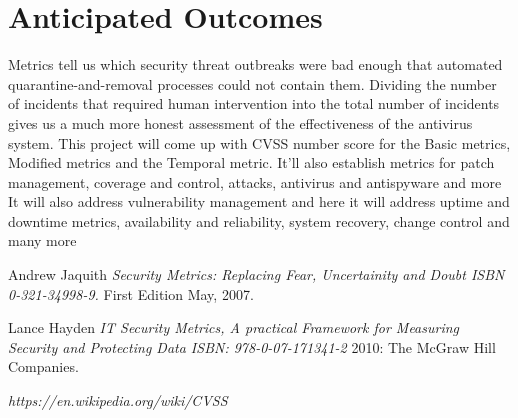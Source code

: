 \documentclass{article}
\begin{document}
\section{Anticipated Outcomes} Metrics tell us
which security threat outbreaks were bad enough that automated quarantine-and-removal
processes could not contain them. Dividing the number of incidents that required
human intervention into the total number of incidents gives us a much more honest
assessment of the effectiveness of the antivirus system. \linebreak
This project will come up with CVSS number score for the Basic metrics, Modified metrics and the Temporal metric. It’ll also establish metrics for patch management, coverage and control, attacks, antivirus and antispyware and more
It will also address vulnerability management and here it will address uptime and downtime metrics, availability and reliability, system recovery, change control and many more

 \begin{thebibliography}{1}

   Andrew Jaquith {\em Security Metrics: Replacing Fear, Uncertainity and Doubt
 ISBN 0-321-34998-9.} First Edition May, 2007.

    Lance Hayden {\em IT Security Metrics, A practical Framework for Measuring Security and Protecting Data ISBN: 978-0-07-171341-2} 2010:
  The McGraw Hill Companies.

    {\em https://en.wikipedia.org/wiki/CVSS

} 

  \end{thebibliography}
\end{document}
